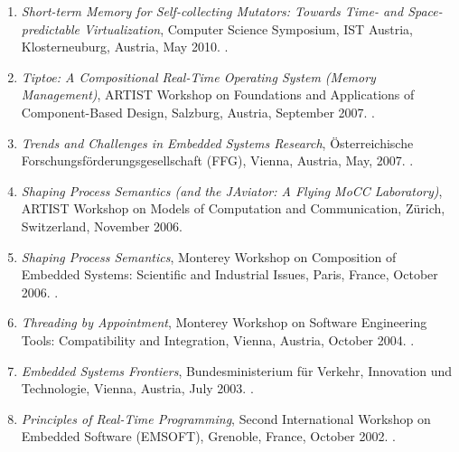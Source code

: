 {\begin{enumerate}
\item \emph{Short-term Memory for Self-collecting Mutators: Towards Time- and Space-predictable Virtualization},
Computer Science Symposium, IST Austria, Klosterneuburg, Austria, May 2010.
.

\item \emph{Tiptoe: A Compositional Real-Time Operating System (Memory Management)},
ARTIST Workshop on Foundations and Applications of Component-Based Design, Salzburg, Austria, September 2007.
.

\item \emph{Trends and Challenges in Embedded Systems Research},
{\"O}sterreichische Forschungsf{\"o}rderungsgesellschaft (FFG), Vienna, Austria, May, 2007.
.

\item \emph{Shaping Process Semantics (and the JAviator: A Flying MoCC Laboratory)},
ARTIST Workshop on Models of Computation and Communication, Z{\"u}rich, Switzerland, November 2006.

\item \emph{Shaping Process Semantics},
Monterey Workshop on Composition of Embedded Systems: Scientific and Industrial Issues,
Paris, France, October 2006.
.

\item \emph{Threading by Appointment},
Monterey Workshop on Software Engineering Tools: Compatibility and Integration, Vienna, Austria, October 2004.
.

\item \emph{Embedded Systems Frontiers},
Bundesministerium f{\"u}r Verkehr, Innovation und Technologie, Vienna, Austria, July 2003.
.

\item \emph{Principles of Real-Time Programming},
Second International Workshop on Embedded Software (EMSOFT), Grenoble, France, October 2002.
.
\end{enumerate}
}


